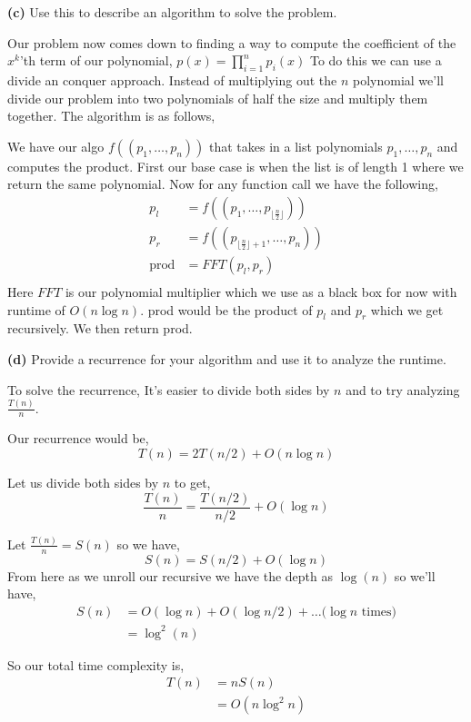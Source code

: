 \documentclass[12pt]{article}
\newcommand{\question}[3][Q]{
\begin{description}
\item \textbf{#1{#2}} #3
\end{description}
}
\newcommand{\hint}[1]{{\footnotesize
    \begin{description}
    [leftmargin=3.3em,style=nextline]
        \item[Hint:] {#1}
    \end{description}}   
}
\begin{document}
\question[]{(c)}{
    Use this to describe an algorithm to solve the problem. 
}
\begin{answer}
    Our problem now comes down to finding a way to compute the coefficient of the $x^{k}$'th term of our polynomial, $ p(x) = \prod_{i = 1}^{n} p_i(x) $
    To do this we can use a divide an conquer approach. Instead of multiplying out the $n$ polynomial we'll divide our problem into two polynomials of half the size and multiply them together. The algorithm is as follows,

    We have our algo $f((p_1,\dots,p_n))$ that takes in a list polynomials $p_1,\dots,p_n$ and computes the product. First our base case is when the list is of length 1 where we return the same polynomial. Now for any function call we have the following,
    \begin{align*}
        p_l &= f((p_1,\dots,p_{\lfloor \frac{n}{2} \rfloor}))\\
        p_r &= f((p_{\lfloor \frac{n}{2} \rfloor + 1}, \dots, p_n))\\
        \text{prod} &= FFT(p_l, p_r)\\
    \end{align*}
    Here $FFT $ is our polynomial multiplier which we use as a black box for now with runtime of $O(n\log n)$. prod would be the product of  $p_l$ and  $p_r$ which we get recursively. We then return prod.
\end{answer}

\question[]{(d)}{
    Provide a recurrence for your algorithm and use it to analyze the runtime.

    \hint{To solve the recurrence, It's easier to divide both sides by $n$ and to try analyzing $\frac{T(n)}{n}$.}
}
\begin{answer}
    Our recurrence would be, 
    $$ T(n) = 2T(n /2) + O(n \log n) $$ 

    Let us divide both sides by $n$ to get, 
    $$ \frac{T(n)}{n} = \frac{T(n /2)}{n /2} + O(\log n) $$ 

    Let $\frac{T(n)}{n} = S(n)$ so we have, 
    $$ S(n) = S(n /2) + O(\log n) $$ 
    From here as we unroll our recursive we have the depth as $\log(n)$ so we'll have, 
    \begin{align*}
        S(n) &= O(\log n) + O(\log n /2) + \dots  \text{($\log n$ times)}\\
             &= \log^2(n)
    \end{align*}

    So our total time complexity is, 
    \begin{align*}
        T(n) &= n S(n)\\
             &= O(n \log^2 n)
    \end{align*}
\end{answer}
\end{document}
